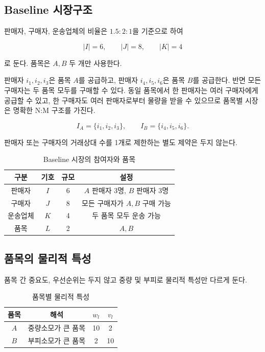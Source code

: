 \documentclass[11pt,a4paper]{article}
\begin{document}
\subsection{Baseline 시장구조}

판매자, 구매자, 운송업체의 비율은 $1.5:2:1$을 기준으로 하여

\[
|I|=6,\qquad |J|=8,\qquad |K|=4
\]

로 둔다. 품목은 $A,B$ 두 개만 사용한다.

판매자 $i_1,i_2,i_3$은 품목 $A$를 공급하고,
판매자 $i_4,i_5,i_6$은 품목 $B$를 공급한다.
반면 모든 구매자는 두 품목 모두를 구매할 수 있다.
동일 품목에서 한 판매자는 여러 구매자에게 공급할 수 있고,
한 구매자도 여러 판매자로부터 물량을 받을 수 있으므로 품목별 시장은 명확한 N:M 구조를 가진다.

\[
I_A=\{i_1,i_2,i_3\},\qquad
I_B=\{i_4,i_5,i_6\}.
\]

판매자 또는 구매자의 거래상대 수를 1개로 제한하는 별도 제약은 두지 않는다.

\begin{table}[h!]
\centering
\caption{Baseline 시장의 참여자와 품목}
\begin{tabular}{cccc}
\toprule
\textbf{구분} & \textbf{기호} & \textbf{규모} & \textbf{설정} \\
\midrule
판매자 & $I$ & 6 & $A$ 판매자 3명, $B$ 판매자 3명 \\
구매자 & $J$ & 8 & 모든 구매자가 $A,B$ 구매 가능 \\
운송업체 & $K$ & 4 & 두 품목 모두 운송 가능 \\
품목 & $L$ & 2 & $A,B$ \\
\bottomrule
\end{tabular}
\end{table}

\subsection{품목의 물리적 특성}

품목 간 중요도, 우선순위는 두지 않고 중량 및 부피로 물리적 특성만 다르게 둔다.

\begin{table}[h!]
\centering
\caption{품목별 물리적 특성}
\begin{tabular}{cccc}
\toprule
\textbf{품목} & \textbf{해석} & $w_l$ & $v_l$ \\
\midrule
$A$ & 중량소모가 큰 품목 & 10 & 2 \\
$B$ & 부피소모가 큰 품목 & 2 & 10 \\
\bottomrule
\end{tabular}
\end{table}
\end{document}
